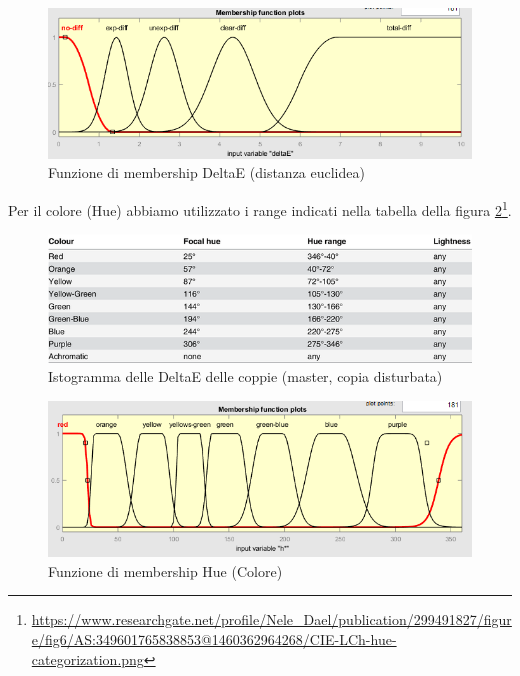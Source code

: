 \begin{figure}[!ht]
\begin{center}
	\includegraphics[scale=0.8]{images/rete2-membership-deltae.PNG}
\end{center}
\caption{Funzione di membership DeltaE (distanza euclidea)}
\label{fig:membdeltae}
\end{figure}

Per il colore (Hue) abbiamo utilizzato i range indicati nella tabella della figura \ref{fig:ciehue}\footnote{\url{https://www.researchgate.net/profile/Nele_Dael/publication/299491827/figure/fig6/AS:349601765838853@1460362964268/CIE-LCh-hue-categorization.png}}.
\begin{figure}[!ht]
\begin{center}
	\includegraphics[scale=2.5]{images/CIE-LCh-hue-categorization.png}
\end{center}
\caption{Istogramma delle DeltaE delle coppie (master, copia disturbata)}
\label{fig:ciehue}
\end{figure}

\begin{figure}[!ht]
\begin{center}
	\includegraphics[scale=0.8]{images/rete2-membership-colors.PNG}
\end{center}
\caption{Funzione di membership Hue (Colore)}
\label{fig:membcolor}
\end{figure}

